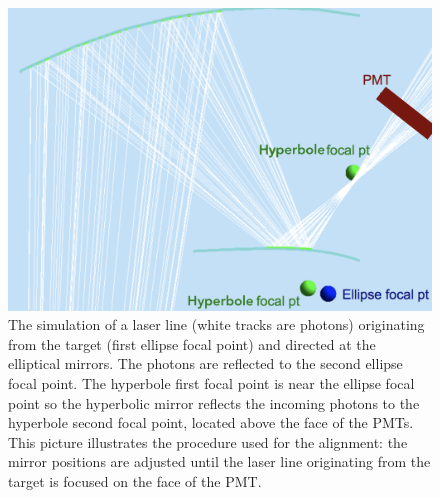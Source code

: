 \begin{figure}
\centering
	\includegraphics[width=0.99\columnwidth,  height=0.75\columnwidth]{img/mirrorAlignmentSimulationZoomed.png}
	\caption{The simulation of a laser line (white tracks are photons) originating from the target (first ellipse focal point) and directed at the elliptical mirrors.
             The photons are reflected to the second ellipse focal point. The hyperbole first focal point is near the ellipse focal point so the hyperbolic mirror
			 reflects the incoming photons to the hyperbole second focal point, located above the face of the PMTs.
			 This picture illustrates the procedure used for the alignment: the mirror positions are adjusted until the laser line originating from
			 the target is focused on the face of the PMT.}
	\label{fig:alignmentSimulation}
\end{figure}

